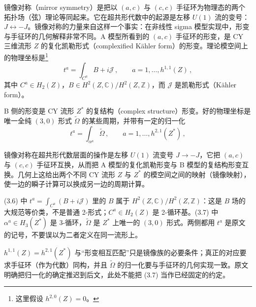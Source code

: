 镜像对称（mirror symmetry）是把以 $(a,c)$ 与 $(c,c)$ 手征环为物理态的两个拓扑场（弦）理论等同起来。它在超共形代数中的起源是左移 $U(1)$ 流的变号：$J\leftrightarrow-J$。镜像对称的力量来自这样一个事实：在非线性 sigma 模型实现中，形变与手征环的几何解释非常不同。A 模型所看到的 $(a,c)$ 手征环的形变，是 CY 三维流形 $Z$ 的复化凯勒形式（complexified Kähler form）的形变。理论模空间上的物理坐标是\footnote{这里假设 $h^{2,0}(Z)=0$。}
\begin{equation}\tag{3.6}
t^{a}=\int_{C^{a}}B+i\mathcal{J}\,,\qquad a=1,\ldots,h^{1,1}(Z)\,,
\end{equation}
其中 $C^{a}\in H_2(Z)$，$B\in H^2(Z,\mathbb{C})/H^2(Z,\mathbb{Z})$，而 $\mathcal{J}$ 是凯勒形式（Kähler form）。

B 侧的形变是 CY 流形 $Z^{*}$ 的复结构（complex structure）形变。好的物理坐标是唯一全纯 $(3,0)$ 形式 $\tilde\Omega$ 的某些周期，并带有一定的归一化
\begin{equation}\tag{3.7}
t^{a}=\int_{\alpha^{a}}\tilde\Omega\,,\qquad a=1,\ldots,h^{2,1}(Z^{*})\,,
\end{equation}

\begin{yizhu}[物理图像]
镜像对称在超共形代数层面的操作是左移 $U(1)$ 流变号 $J\to-J$，它把 $(a,c)$ 与 $(c,c)$ 手征环互换，从而把 A 模型的复化凯勒形变与 B 模型的复结构形变互换。几何上这给出两个不同 CY 流形 $Z$ 与 $Z^{*}$ 的模空间之间的映射（镜像映射），使一边的瞬子计算可以换成另一边的周期计算。
\end{yizhu}

\begin{yizhu}[易错点]
(3.6) 中 $t^{a}=\int_{C^{a}}(B+i\mathcal{J})$ 里的 $B$ 属于 $H^2(Z,\mathbb{C})/H^2(Z,\mathbb{Z})$：这是 $B$ 场的大规范等价类，不是普通 2-形式；$C^{a}\in H_2(Z)$ 是 2-循环基。(3.7) 中 $\alpha^{a}\in H_3(Z^{*})$ 是 3-循环，$\tilde\Omega$ 是 $Z^{*}$ 上唯一的 $(3,0)$ 形式。两侧都用 $t^{a}$ 是原文的记号，不要误以为二者定义在同一流形上。
\end{yizhu}

\begin{yizhu}[含糊点]
$h^{1,1}(Z)=h^{2,1}(Z^{*})$ 与“形变相互匹配”只是镜像族的必要条件；真正的对应要求手征环（作为代数）同构，并且 $\tilde\Omega$ 的归一化要与手征环的几何实现一致。原文明确把归一化的确定推迟到后文，此处不能把 (3.7) 当作已经固定的约定。
\end{yizhu}

